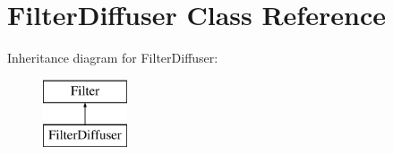 \hypertarget{class_filter_diffuser}{\section{Filter\-Diffuser Class Reference}
\label{class_filter_diffuser}
}
Inheritance diagram for Filter\-Diffuser\-:\begin{figure}[H]
\begin{center}
\leavevmode
\includegraphics[height=2.000000cm]{class_filter_diffuser}
\end{center}
\end{figure}
